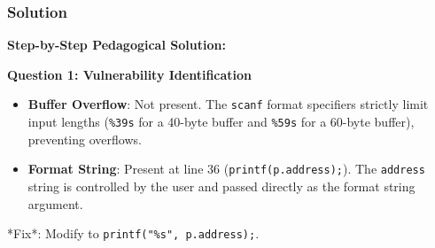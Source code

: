 \documentclass{article}
\begin{document}
\subsubsection*{Solution}
\textbf{Step-by-Step Pedagogical Solution:}

\textbf{Question 1: Vulnerability Identification}
\begin{itemize}
    \item \textbf{Buffer Overflow}: Not present. The \texttt{scanf} format specifiers strictly limit input lengths (\texttt{\%39s} for a 40-byte buffer and \texttt{\%59s} for a 60-byte buffer), preventing overflows.
    \item \textbf{Format String}: Present at line 36 (\texttt{printf(p.address);}). The \texttt{address} string is controlled by the user and passed directly as the format string argument.
\end{itemize}
*Fix*: Modify to \texttt{printf("\%s", p.address);}.
\end{document}
